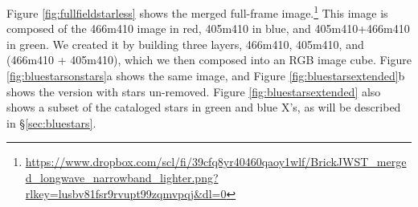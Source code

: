 \documentclass[times,astrosymb,twocolumn]{aastex631}
\def\rr#1{#1}
\begin{document}
Figure \ref{fig:fullfieldstarless} shows the merged full-frame image.\footnote{\url{https://www.dropbox.com/scl/fi/39cfq8yr40460qaoy1wlf/BrickJWST_merged_longwave_narrowband_lighter.png?rlkey=lusbv81fsr9rvupt99zqmvpqj&dl=0}}
\rr{This image is composed of the 466m410 image in red, 405m410 in blue, and 405m410+466m410 in green.}
\rr{We created it by building three layers, 466m410, 405m410, and (466m410 + 405m410), which we then composed into an RGB image cube.}
Figure \ref{fig:bluestarsonstars}a shows the \rr{same image}, and Figure \ref{fig:bluestarsextended}b shows the version with stars \rr{un-removed}.
\rr{Figure \ref{fig:bluestarsextended} also shows a subset of the cataloged stars in green and blue X's, as will be described in \S \ref{sec:bluestars}.}



\end{document}
